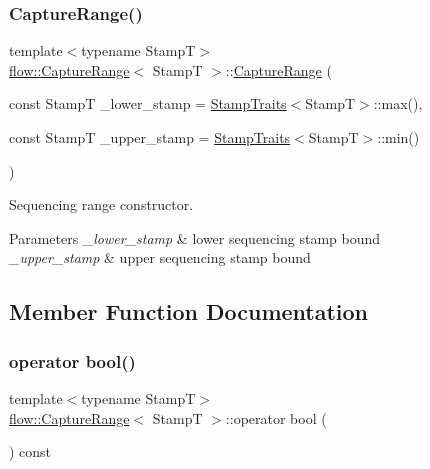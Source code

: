 \subsubsection{\texorpdfstring{Capture\+Range()}{CaptureRange()}}
{\footnotesize\ttfamily template$<$typename StampT$>$ \\
\hyperlink{structflow_1_1_capture_range}{flow\+::\+Capture\+Range}$<$ StampT $>$\+::\hyperlink{structflow_1_1_capture_range}{Capture\+Range} (\begin{DoxyParamCaption}\item[{const StampT}]{\+\_\+lower\+\_\+stamp = {\ttfamily \hyperlink{structflow_1_1_stamp_traits}{Stamp\+Traits}$<$StampT$>$\+:\+:max()},  }\item[{const StampT}]{\+\_\+upper\+\_\+stamp = {\ttfamily \hyperlink{structflow_1_1_stamp_traits}{Stamp\+Traits}$<$StampT$>$\+:\+:min()} }\end{DoxyParamCaption})\hspace{0.3cm}{\ttfamily [inline]}}



Sequencing range constructor. 


\begin{DoxyParams}{Parameters}
{\em \+\_\+lower\+\_\+stamp} & lower sequencing stamp bound \\
\hline
{\em \+\_\+upper\+\_\+stamp} & upper sequencing stamp bound \\
\hline
\end{DoxyParams}


\subsection{Member Function Documentation}
\mbox{\label{structflow_1_1_capture_range_a9e48db61b83970a676a34c8af7bae594}} 
\subsubsection{\texorpdfstring{operator bool()}{operator bool()}}
{\footnotesize\ttfamily template$<$typename StampT$>$ \\
\hyperlink{structflow_1_1_capture_range}{flow\+::\+Capture\+Range}$<$ StampT $>$\+::operator bool (\begin{DoxyParamCaption}{ }\end{DoxyParamCaption}) const\hspace{0.3cm}{\ttfamily [inline]}}



